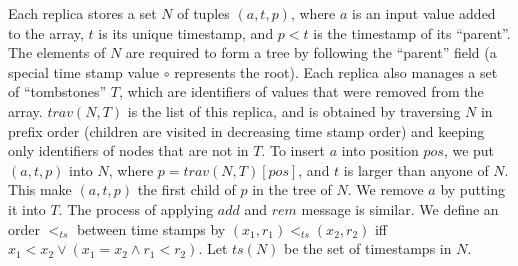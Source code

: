  Each replica stores a set $N$ of tuples $(a,t,p)$, where $a$ is an input value added to the array, $t$ is its unique timestamp, and $p < t$ is the timestamp of its ``parent''. The elements of $N$ are required to form a tree by following the ``parent'' field (a special time stamp value $\circ$ represents the root).
Each replica also manages a set of ``tombstones'' $T$, which are identifiers of values that were removed from the array. {\color {red} $\mathit{trav}(N,T)$ is the list of this replica, and is obtained by traversing $N$ in prefix order (children are visited in decreasing time stamp order) and keeping only identifiers of nodes that are not in $T$. To insert $a$ into position $\mathit{pos}$, we put $(a,t,p)$ into $N$, where $p = \mathit{trav}(N,T)[\mathit{pos}]$, and $t$ is larger than anyone of $N$. This make $(a,t,p)$ the first child of $p$ in the tree of $N$. We remove $a$ by putting it into $T$. The process of applying $\mathit{add}$ and $\mathit{rem}$ message is similar. We define an order $<_{\mathit{ts}}$ between time stamps by $(x_1,r_1) <_{\mathit{ts}} (x_2,r_2)$ iff $x_1 < x_2 \vee (x_1 = x_2 \wedge r_1 < r_2)$. Let $\mathit{ts}(N)$ be the set of timestamps in $N$. 
}








